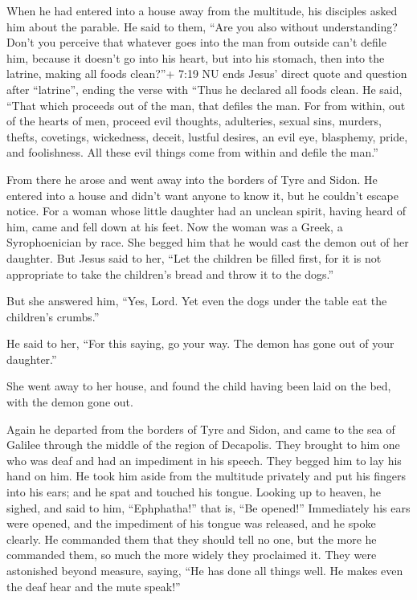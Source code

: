  When he had entered into a house away from the multitude,
his disciples asked him about the parable.  He said to
them, ``Are you also without understanding? Don't you perceive that
whatever goes into the man from outside can't defile him, 
because it doesn't go into his heart, but into his stomach, then into
the latrine, making all foods clean?''+ 7:19 NU ends Jesus' direct quote
and question after ``latrine'', ending the verse with ``Thus he declared
all foods clean.  He said, ``That which proceeds out of the
man, that defiles the man.  For from within, out of the
hearts of men, proceed evil thoughts, adulteries, sexual sins, murders,
thefts,  covetings, wickedness, deceit, lustful desires, an
evil eye, blasphemy, pride, and foolishness.  All these
evil things come from within and defile the man.''

 From there he arose and went away into the borders of Tyre
and Sidon. He entered into a house and didn't want anyone to know it,
but he couldn't escape notice.  For a woman whose little
daughter had an unclean spirit, having heard of him, came and fell down
at his feet.  Now the woman was a Greek, a Syrophoenician
by race. She begged him that he would cast the demon out of her
daughter.  But Jesus said to her, ``Let the children be
filled first, for it is not appropriate to take the children's bread and
throw it to the dogs.''

 But she answered him, ``Yes, Lord. Yet even the dogs under
the table eat the children's crumbs.''

 He said to her, ``For this saying, go your way. The demon
has gone out of your daughter.''

 She went away to her house, and found the child having
been laid on the bed, with the demon gone out.

 Again he departed from the borders of Tyre and Sidon, and
came to the sea of Galilee through the middle of the region of
Decapolis.  They brought to him one who was deaf and had an
impediment in his speech. They begged him to lay his hand on him.
 He took him aside from the multitude privately and put his
fingers into his ears; and he spat and touched his tongue. 
Looking up to heaven, he sighed, and said to him, ``Ephphatha!'' that
is, ``Be opened!''  Immediately his ears were opened, and
the impediment of his tongue was released, and he spoke clearly.
 He commanded them that they should tell no one, but the
more he commanded them, so much the more widely they proclaimed it.
 They were astonished beyond measure, saying, ``He has done
all things well. He makes even the deaf hear and the mute speak!''

